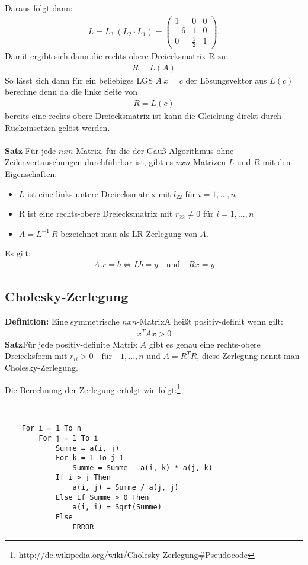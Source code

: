 \documentclass{scrartcl}
\begin{document}
Daraus folgt dann:
\begin{align*}
L=L_3 \ (L_2 \cdot L_1)=\begin{pmatrix}
1  & 0 & 0\\
-6  & 1 & 0\\
0  &\frac{1}{2} & 1
\end{pmatrix}.
\end{align*}
Damit ergibt sich dann die rechts-obere Dreiecksmatrix R zu:
\begin{align*}
R=L(A)
\end{align*}
So lässt sich dann für ein beliebiges LGS $A \ x = c$ der Lösungsvektor aus $L(c)$ berechne denn da die linke Seite von
\begin{align*}
R=L(c)
\end{align*}
bereits eine rechts-obere Dreiecksmatrix ist kann die Gleichung direkt durch Rückeinsetzen gelöst werden. \\
\\
\textbf{Satz} Für jede $nxn$-Matrix, für die der Gauß-Algorithmus ohne Zeilenvertauschungen durchführbar ist, gibt es $nxn$-Matrizen $L$ und $R$ mit den Eigenschaften:
\begin{itemize}
\item $L$ ist eine links-untere Dreiecksmatrix mit $l_{22}$ für $i=1,...,n$
\item R ist eine rechts-obere Dreiecksmatrix mit $r_{22} \neq 0$ für $i=1,...,n$
\item $A=L^{-1} \ R$ bezeichnet man als LR-Zerlegung von $A$. 
\end{itemize}
Es gilt:
\begin{align*}
A \ x = b \Leftrightarrow L b = y \quad \text{und} \quad R x =y
\end{align*}
\subsection{Cholesky-Zerlegung}
\textbf{Definition:} Eine symmetrische $n x n$-MatrixA heißt positiv-definit wenn gilt:
\begin{align*}
x^T Ax>0
\end{align*}
\textbf{Satz}Für jede positiv-definite Matrix $A$ gibt es genau eine rechts-obere Dreiecksform mit $r_{ii}>0 \quad \text{für} \quad 1,...,n$
und $A=R^TR$, diese Zerlegung nennt man Cholesky-Zerlegung. 

Die Berechnung der Zerlegung erfolgt wie folgt:\footnote{http://de.wikipedia.org/wiki/Cholesky-Zerlegung\#Pseudocode} 
\begin{lstlisting}[frame=single]


    For i = 1 To n
        For j = 1 To i
            Summe = a(i, j)
            For k = 1 To j-1
                Summe = Summe - a(i, k) * a(j, k)
            If i > j Then
                a(i, j) = Summe / a(j, j)   
            Else If Summe > 0 Then          
                a(i, i) = Sqrt(Summe)       
            Else
                ERROR                       
\end{lstlisting}
\end{document}
